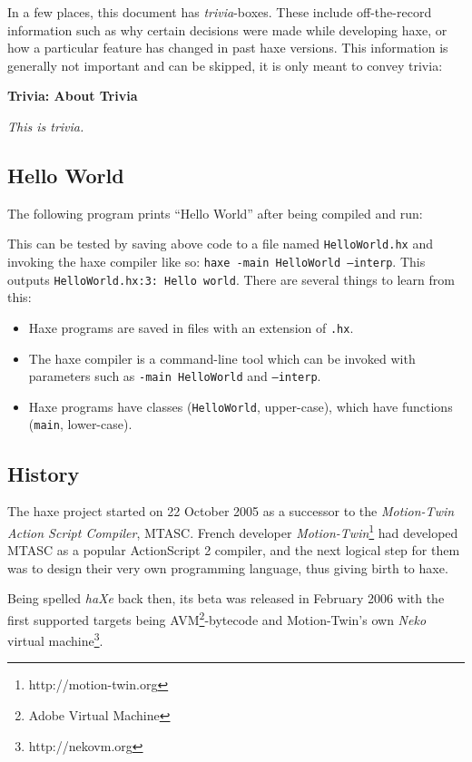 \documentclass{article}
\newcommand{\type}[1]{\texttt{#1}}
\newcommand{\expr}[1]{\texttt{#1}}
\newenvironment{myshaded}
  {\def\FrameCommand{\fboxsep=\topsep\colorbox{bgcolor}}%
  \MakeFramed {\advance\hsize-\width \FrameRestore}}%
 {\endMakeFramed}
\newcommand{\trivia}[2]
	{\begin{myshaded}\noindent\textbf{Trivia: #1}\par\nobreak\noindent\ignorespaces\textit{#2}\end{myshaded}}
\newcommand{\ic}[1]{\texttt{#1}}
\begin{document}
In a few places, this document has \emph{trivia}-boxes. These include off-the-record information such as why certain decisions were made while developing haxe, or how a particular feature has changed in past haxe versions. This information is generally not important and can be skipped, it is only meant to convey trivia:

\trivia{About Trivia}{This is trivia.}


\subsection{Hello World}
\label{Hello World}

The following program prints ``Hello World'' after being compiled and run:


This can be tested by saving above code to a file named \ic{HelloWorld.hx} and invoking the haxe compiler like so: \ic{haxe -main HelloWorld --interp}. This outputs \ic{HelloWorld.hx:3: Hello world}. There are several things to learn from this:

\begin{itemize}
	\item Haxe programs are saved in files with an extension of \ic{.hx}.
	\item The haxe compiler is a command-line tool which can be invoked with parameters such as \ic{-main HelloWorld} and \ic{--interp}.
	\item Haxe programs have classes (\type{HelloWorld}, upper-case), which have functions (\expr{main}, lower-case). 
\end{itemize}

\subsection{History}

The haxe project started on 22 October 2005 as a successor to the \emph{Motion-Twin Action Script Compiler}, MTASC. French developer \emph{Motion-Twin}\footnote{http://motion-twin.org} had developed MTASC as a popular ActionScript 2 compiler, and the next logical step for them was to design their very own programming language, thus giving birth to haxe.

Being spelled \emph{haXe} back then, its beta was released in February 2006 with the first supported targets being AVM\footnote{Adobe Virtual Machine}-bytecode and Motion-Twin's own \emph{Neko} virtual machine\footnote{http://nekovm.org}.
\end{document}
